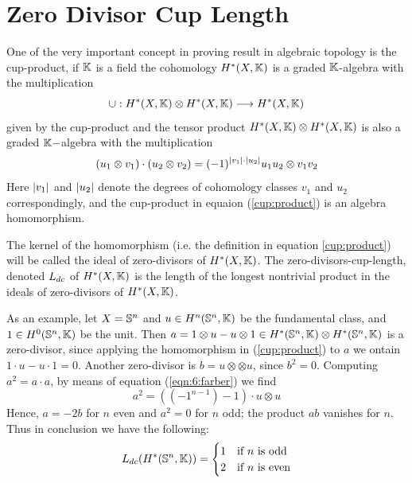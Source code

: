 \section{Zero Divisor Cup Length}

One of the very important concept in proving result in algebraic topology is the cup-product, if $\mathbb{K}$ is a field the cohomology $H^*(X, \mathbb{K})$ is a graded $\mathbb{K}$-algebra with the multiplication
\begin{equation}\label{cup:product}
    \cup: H^*(X, \mathbb{K}) \otimes H^*(X, \mathbb{K}) \longrightarrow H^*(X, \mathbb{K})
\end{equation}
given by the cup-product and the tensor product $H^*(X, \mathbb{K}) \otimes H^*(X, \mathbb{K})$ is also a graded $\mathbb{K}-$algebra with the multiplication
\begin{equation}\label{eqn:6:farber}
    (u_1 \otimes v_1) \cdot (u_2 \otimes v_2) = (-1)^{\lvert v_1\rvert \cdot \lvert u_2\rvert} u_1 u_2 \otimes v_1v_2
\end{equation}
Here $\lvert v_1\rvert$ and $\lvert u_2\rvert$ denote the degrees of cohomology classes $v_1$ and $u_2$ correspondingly, and the cup-product in equaion (\ref{cup:product}) is an algebra homomorphism.

\begin{defn}
    The kernel of the homomorphism (i.e. the definition in equation \ref{cup:product}) will be called the ideal of zero-divisors of $H^*(X, \mathbb{K})$.
    The zero-divisors-cup-length, denoted $L_{dc}$ of $H^*(X, \mathbb{K})$ is the length of the longest nontrivial product in the ideals of zero-divisors of $H^*(X, \mathbb{K})$.
\end{defn}
As an example, let $X = \mathbb{S}^n$ and $u \in H^n(\mathbb{S}^n, \mathbb{K})$ be the fundamental class, and $1 \in H^0(\mathbb{S}^n, \mathbb{K})$ be the unit. Then $a = 1 \otimes u - u \otimes 1 \in H^*(\mathbb{S}^n, \mathbb{K}) \otimes H^*(\mathbb{S}^n, \mathbb{K})$ is a zero-divisor, since applying the homomorphism in (\ref{cup:product}) to $a$ we ontain $1 \cdot u - u\cdot 1 = 0$. Another zero-divisor is $b = u \otimes \otimes u$, since $b^2 = 0$. Computing $a^2 = a \cdot a$, by means of equation (\ref{eqn:6:farber}) we find
\[
    a^2 = \left((-1^{n-1}) - 1\right) \cdot u \otimes u
\]
Hence, $a = - 2b$ for $n$ even and $a^2 = 0$ for $n$ odd; the product $ab$ vanishes for $n$. Thus in conclusion we have the following:
\begin{equation}\label{zdcl:of:sphere}
    L_{dc}(H^*(\mathbb{S}^n, \mathbb{K})) = \begin{cases}
        1 & \text{if $n$ is odd}  \\
        2 & \text{if $n$ is even}
    \end{cases}
\end{equation}



